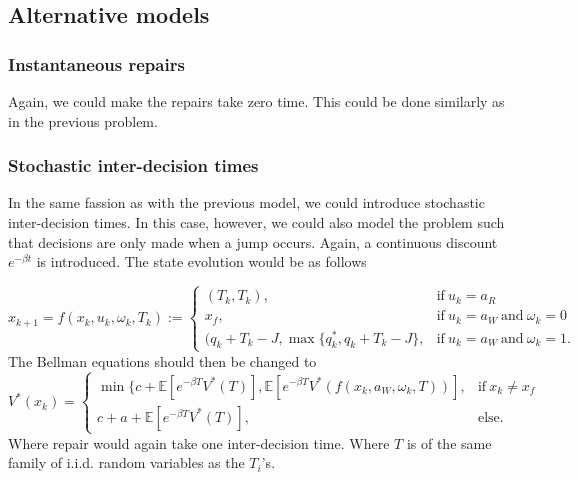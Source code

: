 \subsection{Alternative models}
\subsubsection{Instantaneous repairs}
Again, we could make the repairs take zero time. This could be done similarly as in the previous problem.

\subsubsection{Stochastic inter-decision times}
In the same fassion as with the previous model, we could introduce stochastic inter-decision times. In this case, however, we could also model the problem such that decisions are only made when a jump occurs.
Again, a continuous discount $e^{-\beta t}$ is introduced.
The state evolution would be as follows

\begin{equation}
x_{k+1}=f(x_k,u_k,\omega_k,T_k):=\begin{cases}
(T_k,T_k),&\text{if}\ u_k=a_R \\
x_f,&\text{if}\ u_k=a_W\ \text{and}\ \omega_k=0 \\
(q_k+T_k-J,\max\{q^*_k,q_k+T_k-J\},&\text{if}\ u_k=a_W\ \text{and}\ \omega_k=1.
\end{cases}
\end{equation}
The Bellman equations should then be changed to
\begin{equation}
V^*(x_k)=\begin{cases}
\min\{c+\mathbb{E}[e^{-\beta T} V^*(T)],\mathbb{E}[e^{-\beta T} V^*(f(x_k,a_W,\omega_k,T))],&\text{if}\ x_k\neq x_f \\
c+a+\mathbb{E}[e^{-\beta T} V^*(T)],&\text{else.}
\end{cases}
\end{equation}
Where repair would again take one inter-decision time. Where $T$ is of the same family of i.i.d. random variables as the $T_i$'s.